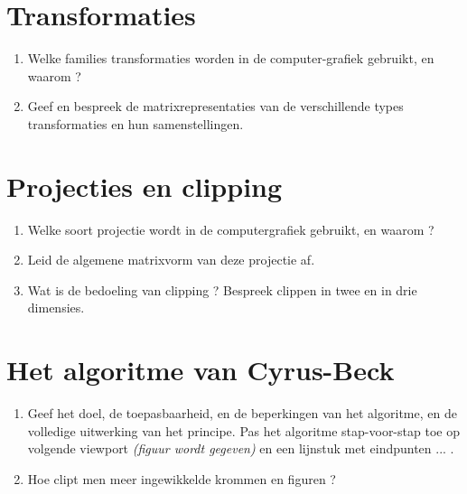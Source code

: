 \documentclass{report}
\begin{document}
	\section{Transformaties}
	\begin{enumerate}
	\item Welke families transformaties worden in de computer-grafiek gebruikt, en waarom ?
	
	\item Geef en bespreek de matrixrepresentaties van de verschillende types transformaties en hun samenstellingen. 
	\end{enumerate}

	\section{Projecties en clipping}

	\begin{enumerate}
	\item Welke soort projectie wordt in de computergrafiek gebruikt, en waarom ?
	
	\item Leid de algemene matrixvorm van deze projectie af. 
	
	\item Wat is de bedoeling van clipping ? Bespreek clippen in twee en in drie dimensies. 
	\end{enumerate}

	\section{Het algoritme van Cyrus-Beck}
	\begin{enumerate}
		\item Geef het doel, de toepasbaarheid, en de beperkingen van het algoritme, en de volledige uitwerking van het principe. Pas het algoritme stap-voor-stap toe op volgende viewport \textit{(figuur wordt gegeven)} en een lijnstuk met eindpunten ... .  
		
		\item Hoe clipt men meer ingewikkelde krommen en figuren ?
	\end{enumerate}
\end{document}
